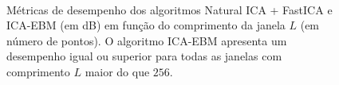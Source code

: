 \begin{figure}
    \centering
    \\
    \caption{Métricas de desempenho dos algoritmos Natural ICA + FastICA e ICA-EBM (em dB) em função do comprimento da janela $L$ (em número de pontos). O algoritmo ICA-EBM apresenta um desempenho igual ou superior para todas as janelas com comprimento $L$ maior do que $256$.}
    \label{fig:window_estimative}
\end{figure}

